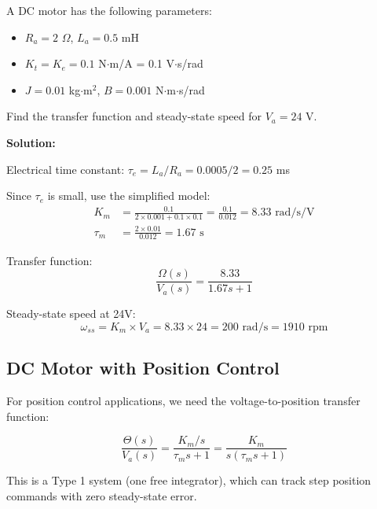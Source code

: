 \begin{examplebox}[title=Example 1.8: DC Motor Analysis]
A DC motor has the following parameters:
\begin{itemize}
    \item $R_a = 2$ $\Omega$, $L_a = 0.5$ mH
    \item $K_t = K_e = 0.1$ N$\cdot$m/A = 0.1 V$\cdot$s/rad
    \item $J = 0.01$ kg$\cdot$m$^2$, $B = 0.001$ N$\cdot$m$\cdot$s/rad
\end{itemize}

Find the transfer function and steady-state speed for $V_a = 24$ V.

\textbf{Solution:}

Electrical time constant: $\tau_e = L_a/R_a = 0.0005/2 = 0.25$ ms

Since $\tau_e$ is small, use the simplified model:
\begin{align}
K_m &= \frac{0.1}{2 \times 0.001 + 0.1 \times 0.1} = \frac{0.1}{0.012} = 8.33 \text{ rad/s/V} \\
\tau_m &= \frac{2 \times 0.01}{0.012} = 1.67 \text{ s}
\end{align}

Transfer function:
\begin{equation}
\frac{\Omega(s)}{V_a(s)} = \frac{8.33}{1.67s + 1}
\end{equation}

Steady-state speed at 24V:
\begin{equation}
\omega_{ss} = K_m \times V_a = 8.33 \times 24 = 200 \text{ rad/s} = 1910 \text{ rpm}
\end{equation}
\end{examplebox}

\subsection{DC Motor with Position Control}
\label{subsec:motor_position}

For position control applications, we need the voltage-to-position transfer function:

\begin{equation}
\frac{\Theta(s)}{V_a(s)} = \frac{K_m/s}{\tau_m s + 1} = \frac{K_m}{s(\tau_m s + 1)}
\end{equation}

This is a Type 1 system (one free integrator), which can track step position commands with zero steady-state error.

